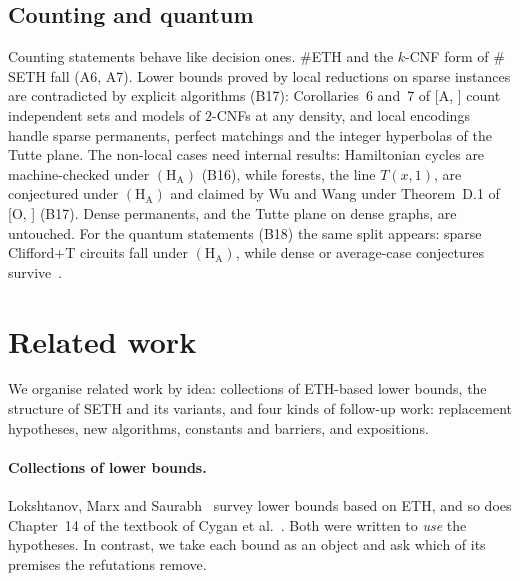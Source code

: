 \documentclass[10pt]{amsart}
\theoremstyle{plain}
\theoremstyle{definition}
\theoremstyle{remark}
\numberwithin{equation}{section}
\newcommand{\A}[1][]{\textup{[A\if\relax\detokenize{#1}\relax\else, #1\fi]}}
\newcommand{\Oa}[1][]{\textup{[O\if\relax\detokenize{#1}\relax\else, #1\fi]}}
\newcommand{\HA}{\ensuremath{(\mathrm{H}_{\mathrm{A}})}}
\begin{document}
\subsection{Counting and quantum}
Counting statements behave like decision ones. $\#$ETH and the $k$-CNF form of $\#$SETH fall
(A6, A7). Lower bounds proved by local reductions on sparse instances are contradicted by explicit
algorithms (B17): Corollaries~6 and~7 of \A{} count independent sets and models of $2$-CNFs at any
density, and local encodings handle sparse permanents, perfect matchings and the integer hyperbolas
of the Tutte plane. The non-local cases need internal results: Hamiltonian cycles are machine-checked under \HA{}
(B16), while forests, the line $T(x,1)$, are conjectured under \HA{} and claimed by Wu and Wang
under Theorem~D.1 of \Oa{} (B17). Dense permanents,
and the Tutte plane on dense graphs, are untouched. For the quantum statements (B18) the same split
appears: sparse Clifford+T circuits fall under \HA, while dense or average-case conjectures
survive~\cite[\S6]{TulsyanQ26}.

\section{Related work}\label{sec:related}

We organise related work by idea: collections of ETH-based lower bounds, the structure of SETH and
its variants, and four kinds of follow-up work: replacement hypotheses, new algorithms, constants and
barriers, and expositions.

\paragraph{Collections of lower bounds.} Lokshtanov, Marx and Saurabh~\cite{LMS11} survey lower
bounds based on ETH, and so does Chapter~14 of the textbook of Cygan et al.~\cite{CyganEtAl15}. Both were written to \emph{use} the hypotheses. In contrast, we take each
bound as an object and ask which of its premises the refutations remove.
\end{document}
